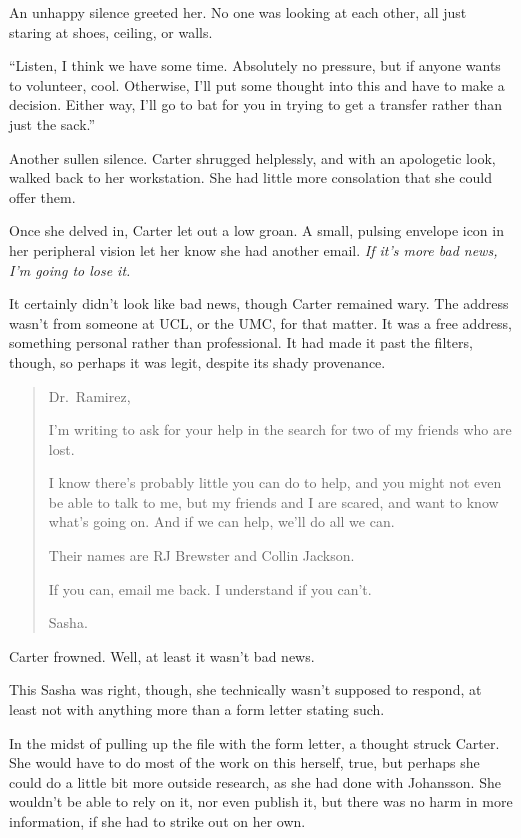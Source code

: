 An unhappy silence greeted her. No one was looking at each other, all just staring at shoes, ceiling, or walls.

``Listen, I think we have some time. Absolutely no pressure, but if anyone wants to volunteer, cool. Otherwise, I'll put some thought into this and have to make a decision. Either way, I'll go to bat for you in trying to get a transfer rather than just the sack.''

Another sullen silence. Carter shrugged helplessly, and with an apologetic look, walked back to her workstation. She had little more consolation that she could offer them.

Once she delved in, Carter let out a low groan. A small, pulsing envelope icon in her peripheral vision let her know she had another email. \emph{If it's more bad news, I'm going to lose it.}

It certainly didn't look like bad news, though Carter remained wary. The address wasn't from someone at UCL, or the UMC, for that matter. It was a free address, something personal rather than professional. It had made it past the filters, though, so perhaps it was legit, despite its shady provenance.

\begin{quote}
Dr.~Ramirez,

I'm writing to ask for your help in the search for two of my friends who are lost.

I know there's probably little you can do to help, and you might not even be able to talk to me, but my friends and I are scared, and want to know what's going on. And if we can help, we'll do all we can.

Their names are RJ Brewster and Collin Jackson.

If you can, email me back. I understand if you can't.

Sasha.
\end{quote}

Carter frowned. Well, at least it wasn't bad news.

This Sasha was right, though, she technically wasn't supposed to respond, at least not with anything more than a form letter stating such.

In the midst of pulling up the file with the form letter, a thought struck Carter. She would have to do most of the work on this herself, true, but perhaps she could do a little bit more outside research, as she had done with Johansson. She wouldn't be able to rely on it, nor even publish it, but there was no harm in more information, if she had to strike out on her own.

